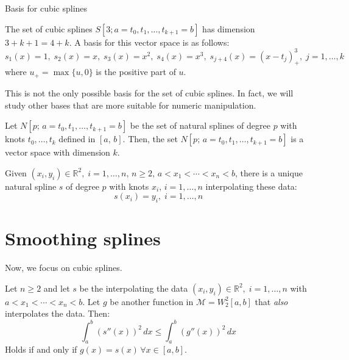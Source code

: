 \begin{example}{Basis for cubic splines}{}

    The set of cubic splines $S[3;a=t_0,t_1,\ldots,t_{k+1}=b]$ has dimension
    $3+k+1 = 4+k$. A basis for this vector space is as follows:
    \begin{equation*}
        s_1(x) = 1,\; s_2(x) = x,\; s_3(x) = x^2,\; s_4(x) = x^3,\;
        s_{j+4}(x) = (x - t_j)^3_+,\; j=1,\ldots,k
    \end{equation*}
    where $u_+ = \max\{u,0\}$ is the positive part of $u$.
    \tcblower
    \begin{note}
        This is not the only possible basis for the set of cubic splines.
        In fact, we will study other bases that are more suitable for numeric manipulation.
    \end{note}
\end{example}

\begin{prop}{}{}
    Let $N[p;\,a=t_0,t_1,\ldots,t_{k+1}=b]$ be the set of natural splines of degree $p$
    with knots $t_0,\ldots,t_{k}$ defined in $[a,\,b]$. Then, the set $N[p;\,a=t_0,t_1,\ldots,t_{k+1}=b]$
    is a vector space with dimension $k$.
\end{prop}

\begin{prop}{}{}
    Given $(x_i,y_i)\in\mathds R^2,\;i=1,\ldots,n,\,n\geq 2,\,
    a < x_1 < \cdots < x_n < b$, there is a unique natural spline $s$
    of degree $p$ with knots $x_i,\,i=1,\ldots,n$ interpolating these
    data:
    \begin{equation*}
        s(x_i) = y_i,\;i=1,\ldots,n
    \end{equation*}
\end{prop}

\pagebreak
\section{Smoothing splines}

Now, we focus on cubic splines.

\begin{prop}{}{}
    Let $n\geq 2$ and let $s$ be the  interpolating the
    data $(x_i,y_i)\in\mathds R^2,\;i=1,\ldots,n$ with $a < x_1 < \cdots < x_n < b$.
    Let $g$ be another function in $\mathcal M = W_2^2[a,b]$ that \emph{also}
    interpolates the data. Then:
    \begin{equation*}
        \int_a^b \left(s''(x)\right)^2\,dx \leq \int_a^b \left(g''(x)\right)^2\,dx
    \end{equation*}
    Holds if and only if $g(x) = s(x)\, \forall x \in [a,b]$.
\end{prop}

